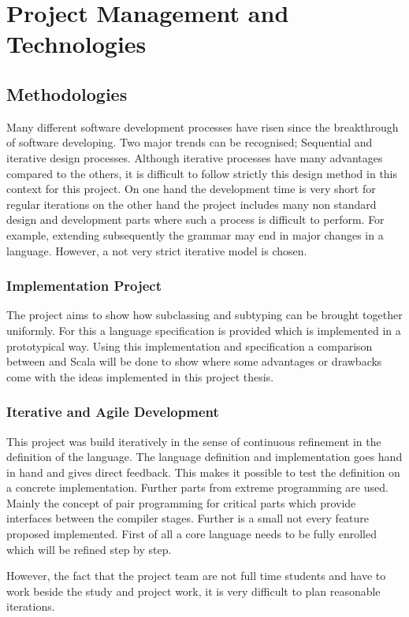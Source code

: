 \chapter{Project Management and Technologies}
\label{ctr:projectManagement}
\section{Methodologies}
Many different software development processes have risen since the
breakthrough of software developing. Two major trends can be recognised;
Sequential and iterative design processes. Although iterative processes
have many advantages compared to the others, it is difficult to follow
strictly this design method in this context for this project. On one
hand the development time is very short for regular iterations on the
other hand the project includes many non standard design and development
parts where such a process is difficult to perform. For example, extending
subsequently the grammar may end in major changes in a language. However,
a not very strict iterative model is chosen.

\subsection{Implementation Project}
The project aims to show how subclassing and subtyping can be brought
together uniformly. For this a language specification is provided which
is implemented in a prototypical way. Using this implementation and
specification a comparison between \ooplss and Scala will be done to
show where some advantages or drawbacks come with the ideas implemented
in this project thesis.

\subsection{Iterative and Agile Development}
This project was build iteratively in the sense of continuous
refinement in the definition of the language. The language definition and
implementation goes hand in hand and gives direct feedback. This makes it
possible to test the definition on a concrete implementation. Further
parts from extreme programming are used. Mainly the concept of pair
programming for critical parts which provide interfaces between the
compiler stages. Further is a small not every feature proposed implemented.
First of all a core language needs to be fully enrolled which will be refined
step by step.

However, the fact that the project team are not full time students and have
to work beside the study and project work, it is very difficult to plan
reasonable iterations.

